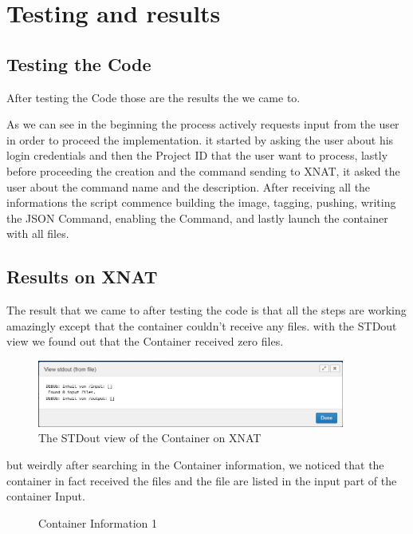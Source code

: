 \chapter{Testing and results}
\section{Testing the Code}
After testing the Code those are the results the we came to. 

 As we can see in the beginning  the process actively requests input from the user in order to proceed the implementation. it started by asking the user about his login credentials and then the Project ID that the user want to process, lastly before proceeding the creation and the command sending to XNAT, it asked the user about the command name and the description.
 After receiving  all the informations the script commence building the image, tagging, pushing, writing the JSON Command, enabling the Command, and lastly launch the container with all files.


 
 \section{Results on XNAT}
 The result that we came to after testing the code is that all the steps are working amazingly except that the container couldn't receive any files. with the \ac{STDout} view we found out that the Container received zero files. 
 
 \begin{figure}
    \centering
    \includegraphics[width=0.9\textwidth]{en/content/STDOUT view.png}
    \caption{The STDout view of the Container on XNAT}
    \label{fig:enter-label}
\end{figure}

but weirdly after searching in the Container information, we noticed that the container in fact received the files and the file are listed in the input part of the container Input. 


\begin{figure}[p]
    \centering
    \caption{Container Information 1}
    \label{fig:container-info-1}
\end{figure}


